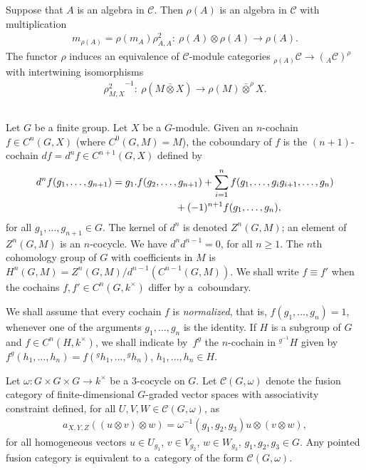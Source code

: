 \documentclass[11pt]{article}
\numberwithin{equation}{section}
\newcommand{\oot}{\bar\otimes}
\newcommand{\C}{{\mathcal C}}
\newcommand{\1}{\textbf{1}}
\begin{document}
Suppose that $A$ is an algebra in $\C$. Then $\rho(A)$ is an algebra in $\C$ with multiplication
\begin{gather*}m_{\rho(A)} = \rho(m_A) \rho^2_{A, A}\colon \ \rho(A) \otimes \rho(A) \to \rho(A).\end{gather*}
The functor $\rho$ induces an equivalence of $\C$-module categories $_{\rho(A)}\C \to (_A\C)^\rho$ with intertwining isomorphisms
\begin{gather*} {\rho^2_{M, X}}^{-1}\colon \ \rho(M \oot X) \to \rho(M) \oot^\rho X.\end{gather*}

\subsection{}\label{cgomega} Let $G$ be a f\/inite group.
Let $X$ be a $G$-module. Given an $n$-cochain $f \in C^n(G, X)$ (where $C^0(G, M) = M$), the coboundary of $f$ is the $(n+1)$-cochain $df = d^nf \in C^{n+1}(G, X)$ def\/ined by
\begin{gather*}d^nf(g_1, \dots, g_{n+1}) = g_1.f(g_2, \dots, g_{n+1}) + \sum_{i = 1}^{n}f(g_1, \dots, g_ig_{i+1}, \dots, g_n)\\
 \hphantom{d^nf(g_1, \dots, g_{n+1}) =}{} + (-1)^{n+1} f(g_1, \dots, g_n),\end{gather*}
for all $g_1, \dots, g_{n+1} \in G$. The kernel of $d^n$ is denoted $Z^n(G, M)$; an element of $Z^n(G, M)$ is an $n$-cocycle. We have $d^nd^{n-1} = 0$, for all $n \geq 1$. The $n$th cohomology group of $G$ with coef\/f\/icients in $M$ is $H^n(G, M) = Z^n(G, M)/d^{n-1}(C^{n-1}(G, M))$. We shall write $f \equiv f'$ when the cochains $f, f' \in C^n(G, k^\times)$ dif\/fer by a~coboundary.

We shall assume that every cochain $f$ is \emph{normalized}, that is, $f(g_1, \dots, g_n) = 1$, whenever one of the arguments $g_1, \dots, g_n$ is the identity. If $H$ is a subgroup of $G$ and $f \in C^n(H, k^\times)$, we shall indicate by~$f^g$ the $n$-cochain in $^{g^{-1}\!}H$ given by $f^g(h_1, \dots, h_n) = f({}^g h_1, \dots, {}^g h_n)$, $h_1, \dots, h_n \in H$.

Let $\omega \colon G \times G \times G \to k^\times$ be a 3-cocycle on $G$. Let $\C(G, \omega)$ denote the fusion category of f\/inite-dimensional $G$-graded vector spaces with associativity constraint def\/ined, for all $U, V, W\in \C(G, \omega)$, as
\begin{gather*}a_{X, Y, Z} ((u \otimes v)\otimes w) = \omega^{-1}(g_1, g_2, g_3) u \otimes (v\otimes w),\end{gather*}
for all homogeneous vectors $u \in U_{g_1}$, $v \in V_{g_2}$, $w \in W_{g_3}$, $g_1, g_2, g_3 \in G$. Any pointed fusion category is equivalent to a~category of the form $\C(G, \omega)$.
\end{document}
